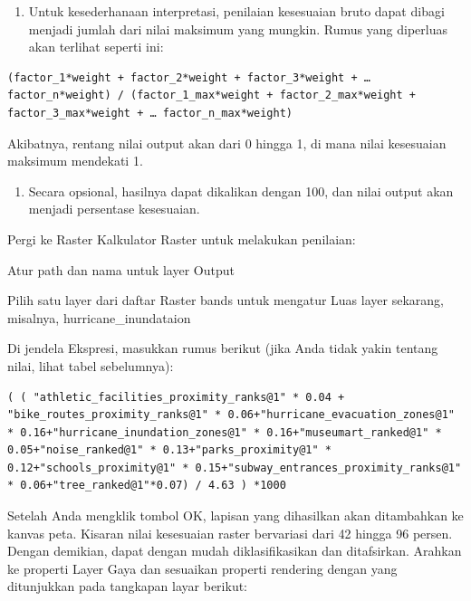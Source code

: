 \documentclass[]{book}
\providecommand{\tightlist}{%
  \setlength{\itemsep}{0pt}\setlength{\parskip}{0pt}}
\begin{document}
\begin{enumerate}
\def\labelenumi{\arabic{enumi}.}
\setcounter{enumi}{1}
\tightlist
\item
  Untuk kesederhanaan interpretasi, penilaian kesesuaian bruto dapat dibagi menjadi jumlah dari nilai maksimum yang mungkin. Rumus yang diperluas akan terlihat seperti ini:
\end{enumerate}

\begin{verbatim}
(factor_1*weight + factor_2*weight + factor_3*weight + … factor_n*weight) / (factor_1_max*weight + factor_2_max*weight + factor_3_max*weight + … factor_n_max*weight)
\end{verbatim}

Akibatnya, rentang nilai output akan dari 0 hingga 1, di mana nilai kesesuaian maksimum mendekati 1.

\begin{enumerate}
\def\labelenumi{\arabic{enumi}.}
\setcounter{enumi}{2}
\tightlist
\item
  Secara opsional, hasilnya dapat dikalikan dengan 100, dan nilai output akan menjadi persentase kesesuaian.
\end{enumerate}

Pergi ke Raster \textbar{} Kalkulator Raster untuk melakukan penilaian:

Atur path dan nama untuk layer Output

Pilih satu layer dari daftar Raster bands untuk mengatur Luas layer sekarang, misalnya, hurricane\_inundataion

Di jendela Ekspresi, masukkan rumus berikut (jika Anda tidak yakin tentang nilai, lihat tabel sebelumnya):

\begin{verbatim}
( ( "athletic_facilities_proximity_ranks@1" * 0.04 + "bike_routes_proximity_ranks@1" * 0.06+"hurricane_evacuation_zones@1" * 0.16+"hurricane_inundation_zones@1" * 0.16+"museumart_ranked@1" * 0.05+"noise_ranked@1" * 0.13+"parks_proximity@1" * 0.12+"schools_proximity@1" * 0.15+"subway_entrances_proximity_ranks@1" * 0.06+"tree_ranked@1"*0.07) / 4.63 ) *1000
\end{verbatim}

Setelah Anda mengklik tombol OK, lapisan yang dihasilkan akan ditambahkan ke kanvas peta. Kisaran nilai kesesuaian raster bervariasi dari 42 hingga 96 persen. Dengan demikian, dapat dengan mudah diklasifikasikan dan ditafsirkan. Arahkan ke properti Layer \textbar{} Gaya dan sesuaikan properti rendering dengan yang ditunjukkan pada tangkapan layar berikut:
\end{document}
